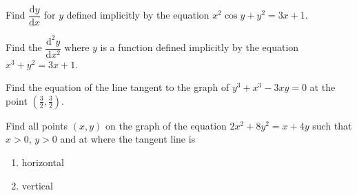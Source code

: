 \begin{exercise}

Find \(\dfrac{\mathrm{d}y}{\mathrm{d}x}\) for \(y\) defined implicitly
by the equation \(x^2\cos y+y^2=3x+1\).

\end{exercise}
\vspace*{6\baselineskip}

\begin{exercise}

Find the \(\dfrac{\mathrm{d}^2y}{\mathrm{d}x^2}\) where \(y\) is a
function defined implicitly by the equation \(x^3+y^2=3x+1\).

\end{exercise}
\vspace*{6\baselineskip}

\begin{exercise}

Find the equation of the line tangent to the graph of \(y^3+x^3 - 3xy=0\)
at the point \((\frac32,\frac32)\).

\end{exercise}
\vspace*{6\baselineskip}

\begin{exercise}

Find all points \((x,y)\) on the graph of the equation
\(2x^2 + 8y^2= x + 4 y\) such that \(x>0\), \(y>0\) and at where the
tangent line is

\begin{enumerate}
\item
  horizontal
\item
  vertical
\end{enumerate}

\end{exercise}

